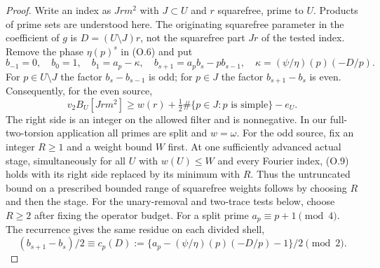 \begin{proof}
Write an index as $Jrm^2$ with $J\subset U$ and $r$ squarefree,
prime to $U$. Products of prime sets are understood here.
The originating squarefree parameter in the coefficient of $g$ is
$D=(U\setminus J)r$, not the squarefree part $Jr$ of the tested index.
Remove the phase $\eta(p)^s$ in (O.6) and put
\[
 b_{-1}=0,\quad b_0=1,\quad b_1=a_p-\kappa,\quad
 b_{s+1}=a_pb_s-pb_{s-1},\quad
 \kappa=(\psi/\eta)(p)(-D/p).
\]
For $p\in U\setminus J$ the factor $b_s-b_{s-1}$ is odd;
for $p\in J$ the factor $b_{s+1}-b_s$ is even.
Consequently, for the even source,
\[
 v_2B_U[Jrm^2]\ge w(r)
              +\tfrac12\#\{p\in J:p\text{ is simple}\}-e_U.      \tag{O.9}
\]
The right side is an integer on the allowed filter and is
nonnegative. In our full-two-torsion application all primes are
split and $w=\omega$.
For the odd source, fix an integer $R\ge1$ and a weight bound $W$
first. At one sufficiently advanced actual stage, simultaneously for
all $U$ with $w(U)\le W$ and every Fourier index, (O.9) holds with
its right side replaced by its minimum with $R$. Thus the untruncated
bound on a prescribed bounded range of squarefree weights follows by
choosing $R$ and then the stage. For the unary-removal and two-trace
tests below, choose $R\ge2$ after fixing the operator budget.
For a split prime $a_p\equiv p+1\pmod4$. The recurrence gives the
same residue on each divided shell,
\[
        (b_{s+1}-b_s)/2\equiv
     c_p(D):=\{a_p-(\psi/\eta)(p)(-D/p)-1\}/2\pmod2.              \tag{O.10}
\]


\end{proof}
